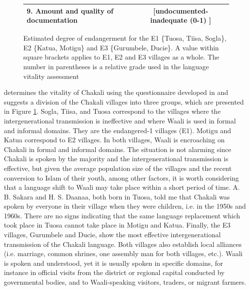 \begin{figure}
\begin{tabular}{p{5cm}p{3.5cm}p{3.5cm}p{3.5cm}}
9.  Amount and quality of documentation &
\multicolumn{3}{c}{[{undocumented-inadequate} (0-1) ]}\\


\bottomrule
  \end{tabular}
  
\caption[Estimated degree of endangerment for the E1, E2 and E3 
villages]{Estimated degree of endangerment for the E1 \{Tuosa, Tiisa, Sogla\}, 
E2 \{Katua, Motigu\} and E3 \{Gurumbele, Ducie\}. A value within square brackets 
 applies to E1, E2 and E3 villages as a whole. The number in parentheses is a 
relative grade used in the  language vitality assessment  
\citep[see][7]{Reco03}} \label{tab:estimate-endangerment}

\end{figure}




 \citet{brin15c} determines the vitality of  Chakali using the 
questionnaire developed in 
\citet{Reco03} and  suggests a division of the Chakali
villages into three groups, which are presented in Figure 
\ref{tab:estimate-endangerment}. 
Sogla,
Tiisa,  and Tuosa correspond to the villages where the intergenerational
transmission is ineffective and where Waali is used in formal and informal
domains. They are the endangered-1  villages (E1).  Motigu and 
Katua correspond to 
E2
villages. In both villages,  Waali is encroaching on  Chakali in
formal and informal domains. The situation is not alarming since Chakali is
spoken by the majority and  the intergenerational transmission is effective, but
given the average population size of the villages and the recent conversion to
Islam of their youth, among other factors, it is worth considering that a 
language shift to Waali may
take place within a short period of time.  A. B. Sakara and H. S. Daanaa, both 
born in
Tuosa, told me that Chakali was spoken by everyone in their village when they
were children, i.e. in the 1950s and 1960s. There  are no signs indicating that 
the same 
language replacement which took place in Tuosa  cannot take place in Motigu and
Katua. Finally, the E3 villages, Gurumbele and Ducie, show the most effective 
intergenerational transmission of the Chakali language. Both villages also 
establish local alliances (i.e. marriage, common shrines, one assembly man for 
both villages, etc.). Waali is spoken and understood, yet it is usually spoken 
in specific  domains, for instance  in official visits from the district or 
regional capital conducted by governmental bodies,  and  to  Waali-speaking 
visitors, traders,  or migrant farmers.


